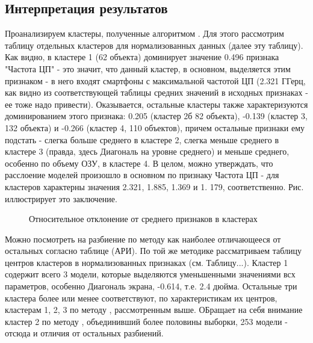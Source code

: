 \documentclass[12pt]{diploma}
\begin{document}
	\subsection{Интерпретация результатов}		
	Проанализируем  кластеры, полученные алгоритмом \AWard.
Для этого рассмотрим таблицу отдельных кластеров для нормализованных данных (далее эту таблицу).
Как видно, в кластере 1 (62 объекта) доминирует значение 0.496 признака "Частота ЦП" - это значит, что данный кластер, в основном, выделяется этим признаком - в него входят смартфоны с максимальной частотой ЦП (2.321 ГГерц, как видно из соответствующей таблицы средних значений в исходных признаках - ее тоже надо привести). Оказывается, остальные кластеры также характеризуются доминированием этого признака: 0.205 (кластер 2б 82 объекта), -0.139 (кластер 3, 132 объекта) и -0.266 (кластер 4, 110 объектов), причем остальные признаки ему подстать - слегка больше среднего в кластере 2, слегка меньше среднего в кластере 3 (правда, здесь Диагональ на уровне среднего) и меньше среднего, особенно по объему ОЗУ, в кластере 4. В целом, можно утверждать, что расслоение моделей произошло в основном по признаку Частота ЦП - для кластеров характерны значения 2.321, 1.885, 1.369 и 1. 179, соответственно. Рис.   иллюстрирует это заключение.

	\begin{figure}[h!] %
		\centering
		\subfigure[\dePDDP]  {\label{fig:interp2}}
		\subfigure[\BiKMR]   {\label{fig:interp3}}
		\subfigure[\AWard]   {\label{fig:interp4}}
		\caption{Относительное отклонение от среднего признаков в кластерах}
		\label{fig:interp}
	\end{figure}	

Можно посмотреть на разбиение по методу \dePDDP как наиболее отличающееся от остальных согласно таблице (АРИ). По той же методике рассматриваем таблицу центров кластеров в нормализованных признаках (см. Таблицу...). Кластер 1 содержит всего 3 модели, которые выделяются уменьшенными значениями всх параметров, особенно Диагональ экрана, -0.614, т.е. 2.4 дюйма. Остальные три кластера более или менее соответствуют, по характеристикам их центров, кластерам 1, 2, 3 по методу \AWard, рассмотренным выше. ОБращает на себя внимание кластер 2 по методу \dePDDP, объединивший более половины выборки, 253 модели - отсюда и отличия от остальных разбиений.
\end{document}
